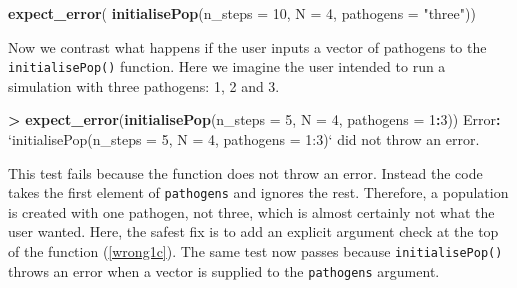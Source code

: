 \documentclass[]{elsarticle} %
\newenvironment{Shaded}{\begin{snugshade}}{\end{snugshade}}
\newcommand{\DataTypeTok}[1]{\textcolor[rgb]{0.13,0.29,0.53}{#1}}
\newcommand{\DecValTok}[1]{\textcolor[rgb]{0.00,0.00,0.81}{#1}}
\newcommand{\KeywordTok}[1]{\textcolor[rgb]{0.13,0.29,0.53}{\textbf{#1}}}
\newcommand{\NormalTok}[1]{#1}
\newcommand{\OperatorTok}[1]{\textcolor[rgb]{0.81,0.36,0.00}{\textbf{#1}}}
\newcommand{\StringTok}[1]{\textcolor[rgb]{0.31,0.60,0.02}{#1}}
\begin{document}
\begin{Shaded}
\begin{Highlighting}[]
\KeywordTok{expect_error}\NormalTok{(}
  \KeywordTok{initialisePop}\NormalTok{(}\DataTypeTok{n_steps =} \DecValTok{10}\NormalTok{, }\DataTypeTok{N =} \DecValTok{4}\NormalTok{, }\DataTypeTok{pathogens =} \StringTok{"three"}\NormalTok{))}
\end{Highlighting}
\end{Shaded}

Now we contrast what happens if the user inputs a vector of pathogens to the \texttt{initialisePop()} function.
Here we imagine the user intended to run a simulation with three pathogens: 1, 2 and 3.
\newline
{}\label{wrong1b}

\begin{Shaded}
\begin{Highlighting}[]
\OperatorTok{>}\StringTok{ }\KeywordTok{expect_error}\NormalTok{(}\KeywordTok{initialisePop}\NormalTok{(}\DataTypeTok{n_steps =} \DecValTok{5}\NormalTok{, }\DataTypeTok{N =} \DecValTok{4}\NormalTok{, }\DataTypeTok{pathogens =} \DecValTok{1}\OperatorTok{:}\DecValTok{3}\NormalTok{))}
\NormalTok{Error}\OperatorTok{:}\StringTok{ `}\DataTypeTok{initialisePop(n_steps = 5, N = 4, pathogens = 1:3)}\StringTok{`} 
\NormalTok{  did not throw an error.}
\end{Highlighting}
\end{Shaded}

This test fails because the function does not throw an error.
Instead the code takes the first element of \texttt{pathogens} and ignores the rest.
Therefore, a population is created with one pathogen, not three, which is almost certainly not what the user wanted.
Here, the safest fix is to add an explicit argument check at the top of the function (\ref{wrong1c}).
The same test now passes because \texttt{initialisePop()} throws an error when a vector is supplied to the \texttt{pathogens} argument.
\newline
{}\label{wrong1c}
\end{document}
